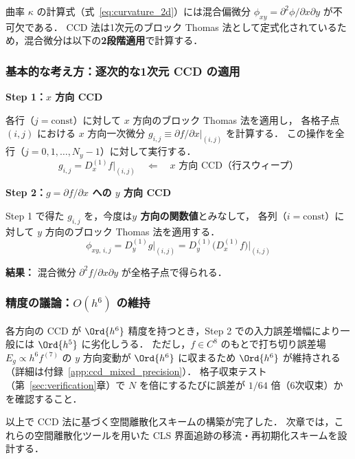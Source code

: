 曲率 $\kappa$ の計算式（式~\eqref{eq:curvature_2d}）には混合偏微分 $\phi_{xy} = \partial^2\phi/\partial x\partial y$ が不可欠である．
CCD 法は1次元のブロック Thomas 法として定式化されているため，混合微分は以下の\textbf{2段階適用}で計算する．

\subsubsection{基本的な考え方：逐次的な1次元 CCD の適用}

\begin{tcolorbox}[resultbox, title={混合微分 $\partial^2 f/\partial x\partial y$ の計算}]
\textbf{Step 1：$x$ 方向 CCD}

各行（$j = \text{const}$）に対して $x$ 方向のブロック Thomas 法を適用し，
各格子点 $(i,j)$ における $x$ 方向一次微分 $g_{i,j} \equiv \partial f/\partial x \big|_{(i,j)}$ を計算する．
この操作を全行（$j = 0, 1, \ldots, N_y-1$）に対して実行する．
\[
  g_{i,j} = D_x^{(1)} f \big|_{(i,j)} \quad \Leftarrow \quad x \text{ 方向 CCD（行スウィープ）}
\]

\textbf{Step 2：$g = \partial f/\partial x$ への $y$ 方向 CCD}

Step 1 で得た $g_{i,j}$ を，今度は\textbf{$y$ 方向の関数値}とみなして，
各列（$i = \text{const}$）に対して $y$ 方向のブロック Thomas 法を適用する．
\[
  \phi_{xy,\,i,j} = D_y^{(1)} g \big|_{(i,j)} = D_y^{(1)}\bigl(D_x^{(1)} f\bigr)\big|_{(i,j)}
\]

\textbf{結果：} 混合微分 $\partial^2 f/\partial x \partial y$ が全格子点で得られる．
\end{tcolorbox}

\subsubsection{精度の議論：\texorpdfstring{$O(h^6)$}{O(h\textasciicircum 6)} の維持}

各方向の CCD が $\Ord{h^6}$ 精度を持つとき，Step 2 での入力誤差増幅により一般には $\Ord{h^5}$ に劣化しうる．
ただし，$f \in C^8$ のもとで打ち切り誤差場 $E_g \propto h^6 f^{(7)}$ の $y$ 方向変動が $\Ord{h^6}$ に収まるため $\Ord{h^6}$ が維持される
（詳細は付録~\ref{app:ccd_mixed_precision}）．
格子収束テスト（第~\ref{sec:verification}章）で $N$ を倍にするたびに誤差が $1/64$ 倍（6次収束）かを確認すること．

\medskip


\medskip
以上で CCD 法に基づく空間離散化スキームの構築が完了した．
次章では，これらの空間離散化ツールを用いた CLS 界面追跡の移流・再初期化スキームを設計する．

